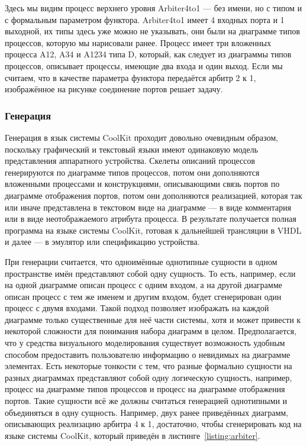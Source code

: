 Здесь мы видим процесс верхнего уровня Arbiter4to1 --- без имени, но с типом и с формальным 
параметром функтора. Arbiter4to1 имеет 4 входных порта и 1 выходной, их типы здесь 
уже можно не указывать, они были на диаграмме типов процессов, которую мы нарисовали 
ранее. Процесс имеет три вложенных процесса A12, A34 и A1234 типа D, который, как 
следует из диаграммы типов процессов, описывает процессы, имеющие два входа и один 
выход. Если мы считаем, что в качестве параметра функтора передаётся арбитр 2 к 1, 
изображённое на рисунке соединение портов решает задачу.

\subsubsection{Генерация}
Генерация в язык системы CoolKit проходит довольно очевидным образом, поскольку графический 
и текстовый языки имеют одинаковую модель представления аппаратного устройства. Скелеты 
описаний процессов генерируются по диаграмме типов процессов, потом они дополняются 
вложенными процессами и конструкциями, описывающими связь портов по диаграмме отображения 
портов, потом они дополняются реализацией, которая так или иначе представлена в текстовом 
виде на диаграмме --- в виде комментария или в виде неотображаемого атрибута процесса. 
В результате получается полная программа на языке системы CoolKit, готовая к дальнейшей 
трансляции в VHDL и далее --- в эмулятор или спецификацию устройства.

При генерации считается, что одноимённые однотипные сущности в одном пространстве 
имён представляют собой одну сущность. То есть, например, если на одной диаграмме 
описан процесс с одним входом, а на другой диаграмме описан процесс с тем же именем 
и другим входом, будет сгенерирован один процесс с двумя входами. Такой подход позволяет 
изображать на каждой диаграмме только существенные для неё части системы, хотя и может 
привести к некоторой сложности для понимания набора диаграмм в целом. Предполагается, 
что у средства визуального моделирования существует возможность удобным способом предоставить 
пользователю информацию о невидимых на диаграмме элементах. Есть некоторые тонкости 
с тем, что разные формально сущности на разных диаграммах представляют собой одну 
логическую сущность, например, процесс на диаграмме типов процессов и процесс на диаграмме 
отображения портов. Такие сущности всё же должны считаться генерацией однотипными и 
объединяться в одну сущность. Например, двух ранее приведённых диаграмм, описывающих 
реализацию арбитра 4 к 1, достаточно, чтобы сгенерировать код на языке системы CoolKit,
который приведён в листинге~\ref{listing:arbiter}.

